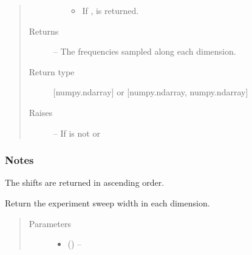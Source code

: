 \documentclass[letterpaper,10pt,english]{sphinxmanual}
\begin{document}
\begin{fulllineitems}
\begin{fulllineitems}
\begin{quote}
\begin{description}
\begin{itemize}
\begin{itemize}
\item {} 
\sphinxAtStartPar
If ,  is returned.

\end{itemize}


\end{itemize}

\item[{Returns}] \leavevmode
\sphinxAtStartPar
{} – The frequencies sampled along each dimension.

\item[{Return type}] \leavevmode
\sphinxAtStartPar
{[}numpy.ndarray{]} or {[}numpy.ndarray, numpy.ndarray{]}

\item[{Raises}] \leavevmode
\sphinxAtStartPar
{\hyperref[\detokenize{references/errors:nmrespy._errors.InvalidUnitError}]{}} – If  is not  or 

\end{description}\end{quote}
\subsubsection*{Notes}

\sphinxAtStartPar
The shifts are returned in ascending order.

\end{fulllineitems}


\begin{fulllineitems}
\label{\detokenize{references/core:nmrespy.core.Estimator.get_sw}}
\sphinxAtStartPar
Return the experiment sweep width in each dimension.
\begin{quote}\begin{description}
\item[{Parameters}] \leavevmode\begin{itemize}
\item {} 
\sphinxAtStartPar
{} (\sphinxstyleliteralemphasis{\sphinxupquote{, }}) – 


\end{itemize}
\end{description}
\end{quote}
\end{fulllineitems}
\end{fulllineitems}
\end{document}
